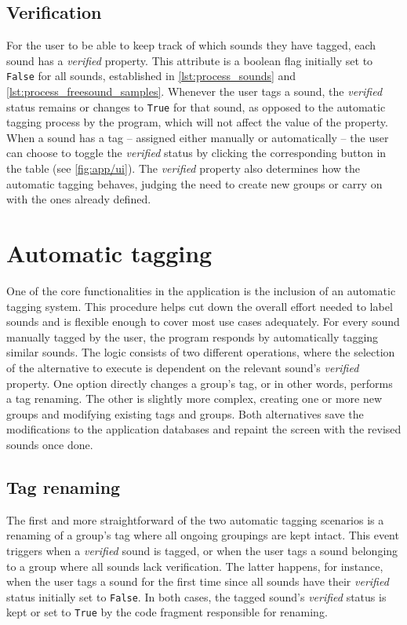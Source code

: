 \subsection{Verification}
For the user to be able to keep track of which sounds they have tagged, each sound has a \emph{verified} property. This attribute is a boolean flag initially set to \texttt{False} for all sounds, established in \cref{lst:process_sounds} and \cref{lst:process_freesound_samples}. Whenever the user tags a sound, the \emph{verified} status remains or changes to \texttt{True} for that sound, as opposed to the automatic tagging process by the program, which will not affect the value of the property. When a sound has a tag – assigned either manually or automatically – the user can choose to toggle the \emph{verified} status by clicking the corresponding button in the table (see \cref{fig:app/ui}). The \emph{verified} property also determines how the automatic tagging behaves, judging the need to create new groups or carry on with the ones already defined.

\section{Automatic tagging}\label{sec:automatic_tagging}
One of the core functionalities in the application is the inclusion of an automatic tagging system. This procedure helps cut down the overall effort needed to label sounds and is flexible enough to cover most use cases adequately. For every sound manually tagged by the user, the program responds by automatically tagging similar sounds. The logic consists of two different operations, where the selection of the alternative to execute is dependent on the relevant sound's \emph{verified} property. One option directly changes a group's tag, or in other words, performs a tag renaming. The other is slightly more complex, creating one or more new groups and modifying existing tags and groups. Both alternatives save the modifications to the application databases and repaint the screen with the revised sounds once done.

\subsection{Tag renaming}
The first and more straightforward of the two automatic tagging scenarios is a renaming of a group's tag where all ongoing groupings are kept intact. This event triggers when a \emph{verified} sound is tagged, or when the user tags a sound belonging to a group where all sounds lack verification. The latter happens, for instance, when the user tags a sound for the first time since all sounds have their \emph{verified} status initially set to \texttt{False}. In both cases, the tagged sound's \emph{verified} status is kept or set to \texttt{True} by the code fragment responsible for renaming.
\begin{mdframed}[style=code]
    
\end{mdframed}

